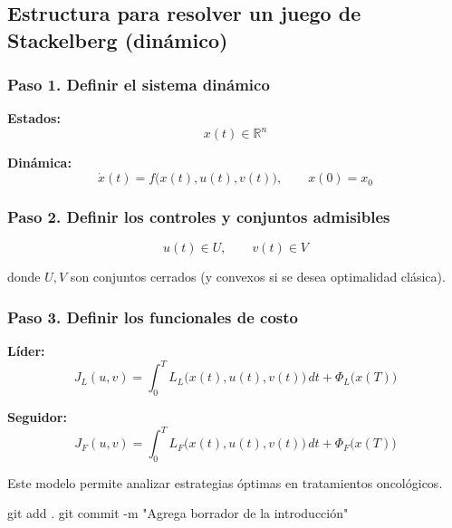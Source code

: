 \subsection*{Estructura para resolver un juego de Stackelberg (dinámico)}

\subsubsection*{Paso 1. Definir el sistema dinámico}

\textbf{Estados:}
\[
x(t) \in \mathbb{R}^n
\]

\textbf{Dinámica:}
\[
\dot{x}(t) = f\big(x(t), u(t), v(t)\big), 
\qquad x(0) = x_0
\]

\subsubsection*{Paso 2. Definir los controles y conjuntos admisibles}

\[
u(t) \in U, \qquad v(t) \in V
\]

donde \(U, V\) son conjuntos cerrados (y convexos si se desea optimalidad clásica).

\subsubsection*{Paso 3. Definir los funcionales de costo}

\textbf{Líder:}
\[
J_L(u,v) = \int_0^T L_L\big(x(t),u(t),v(t)\big)\,dt
+ \Phi_L\big(x(T)\big)
\]

\textbf{Seguidor:}
\[
J_F(u,v) = \int_0^T L_F\big(x(t),u(t),v(t)\big)\,dt
+ \Phi_F\big(x(T)\big)
\]




Este modelo permite analizar estrategias óptimas en tratamientos oncológicos.

git add .
git commit -m "Agrega borrador de la introducción"
